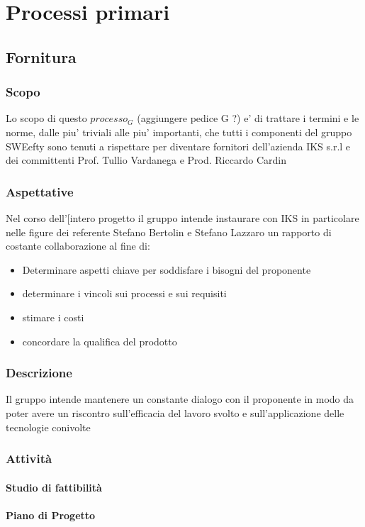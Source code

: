 \section{Processi primari}

\subsection{Fornitura}
	
	\subsubsection{Scopo}
		Lo scopo di questo $processo_G$ (aggiungere pedice  G ?) e' di trattare i termini e le norme, dalle piu' triviali alle piu' importanti, che tutti i componenti del gruppo SWEefty sono tenuti a rispettare per diventare fornitori dell'azienda IKS s.r.l e dei committenti Prof. Tullio Vardanega e Prod. Riccardo Cardin
	\subsubsection{Aspettative}
	Nel corso dell'[intero progetto il gruppo intende instaurare con IKS in particolare nelle figure dei referente Stefano Bertolin e Stefano Lazzaro un rapporto di costante collaborazione al fine di:
	\begin{itemize}
	\item Determinare aspetti chiave per soddisfare i bisogni del proponente
	\item determinare i vincoli sui processi e sui requisiti
	\item stimare i costi 
	\item concordare la qualifica del prodotto
	\end{itemize}
	\subsubsection{Descrizione}
	Il gruppo intende mantenere un constante dialogo con il proponente in modo da poter avere un riscontro sull'efficacia del lavoro svolto e sull'applicazione delle tecnologie conivolte
	\subsubsection{Attività}
		\paragraph{Studio di fattibilità}
		\paragraph{Piano di Progetto}
